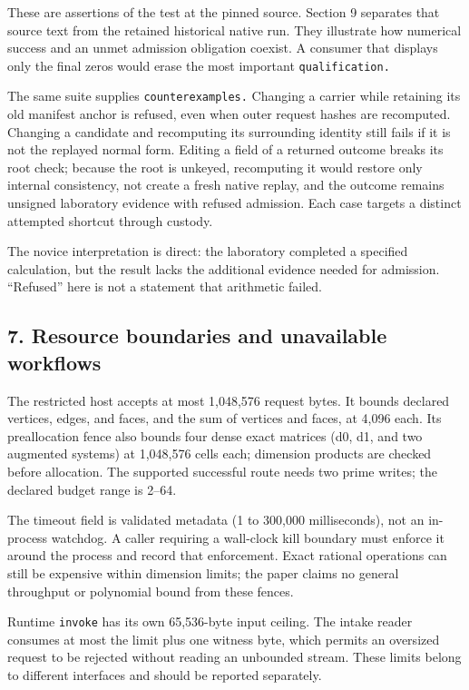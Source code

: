 \documentclass[
  11pt,
]{article}
\newcommand{\passthrough}[1]{#1}
\begin{document}
These are assertions of the test at the pinned source. Section 9
separates that source text from the retained historical native run. They
illustrate how numerical success and an unmet admission obligation
coexist. A consumer that displays only the final zeros would erase the
most important \nolinkurl{qualification.}

The same suite supplies \nolinkurl{counterexamples.} Changing a carrier
while retaining its old manifest anchor is refused, even when outer
request hashes are recomputed. Changing a candidate and recomputing its
surrounding identity still fails if it is not the replayed normal form.
Editing a field of a returned outcome breaks its root check; because the
root is unkeyed, recomputing it would restore only internal consistency,
not create a fresh native replay, and the outcome remains unsigned
laboratory evidence with refused admission. Each case targets a distinct
attempted shortcut through custody.

The novice interpretation is direct: the laboratory completed a
specified calculation, but the result lacks the additional evidence
needed for admission. ``Refused'' here is not a statement that
arithmetic failed.

\subsection{7. Resource boundaries and unavailable
workflows}\label{resource-boundaries-and-unavailable-workflows}

The restricted host accepts at most 1,048,576 request bytes. It bounds
declared vertices, edges, and faces, and the sum of vertices and faces,
at 4,096 each. Its preallocation fence also bounds four dense exact
matrices (d0, d1, and two augmented systems) at 1,048,576 cells each;
dimension products are checked before allocation. The supported
successful route needs two prime writes; the declared budget range is
2--64.

The timeout field is validated metadata (1 to 300,000 milliseconds), not
an in-process watchdog. A caller requiring a wall-clock kill boundary
must enforce it around the process and record that enforcement. Exact
rational operations can still be expensive within dimension limits; the
paper claims no general throughput or polynomial bound from these
fences.

Runtime \passthrough{\lstinline!invoke!} has its own 65,536-byte input
ceiling. The intake reader consumes at most the limit plus one witness
byte, which permits an oversized request to be rejected without reading
an unbounded stream. These limits belong to different interfaces and
should be reported separately.
\end{document}
